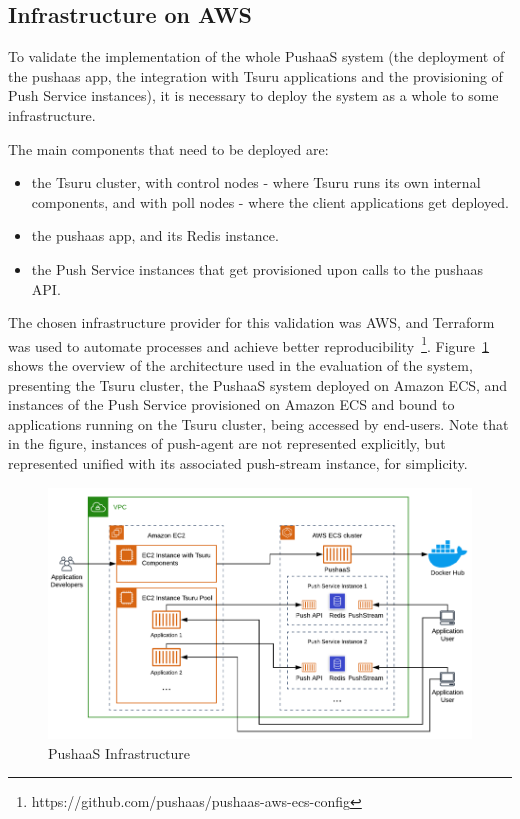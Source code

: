 \subsection{Infrastructure on AWS}

To validate the implementation of the whole PushaaS system (the deployment of the pushaas app, the integration with Tsuru applications and the provisioning of Push Service instances), it is necessary to deploy the system as a whole to some infrastructure.

The main components that need to be deployed are:
\begin{itemize}
    \item the Tsuru cluster, with control nodes - where Tsuru runs its own internal components, and with poll nodes - where the client applications get deployed.
    \item the pushaas app, and its Redis instance.
    \item the Push Service instances that get provisioned upon calls to the pushaas API.
\end{itemize}

The chosen infrastructure provider for this validation was AWS, and Terraform was used to automate processes and achieve better reproducibility~\footnote{https://github.com/pushaas/pushaas-aws-ecs-config}. Figure~\ref{fig:pushaas-infrastructure} shows the overview of the architecture used in the evaluation of the system, presenting the Tsuru cluster, the PushaaS system deployed on Amazon ECS, and instances of the Push Service provisioned on Amazon ECS and bound to applications running on the Tsuru cluster, being accessed by end-users. Note that in the figure, instances of push-agent are not represented explicitly, but represented unified with its associated push-stream instance, for simplicity.

\begin{figure}
	\caption{PushaaS Infrastructure}
	\label{fig:pushaas-infrastructure}
	\centering%
	\includegraphics[width=\linewidth]{images/pushaas-infrastructure.png}
\end{figure}

